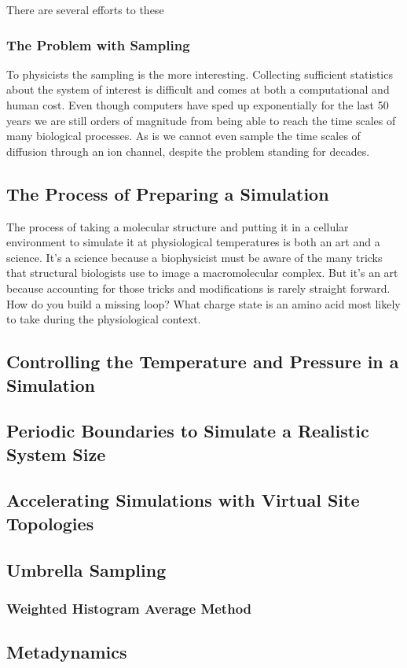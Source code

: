 There are several efforts to these 

\subsubsection{The Problem with Sampling}

To physicists the sampling is the more interesting. Collecting sufficient statistics about the system of interest is difficult and comes at both a computational and human cost. Even though computers have sped up exponentially for the last 50 years we are still orders of magnitude from being able to reach the time scales of many biological processes. As is we cannot even sample the time scales of diffusion through an ion channel, despite the problem standing for decades. 


\subsection{The Process of Preparing a Simulation}
The process of taking a molecular structure and putting it in a cellular environment to simulate it at physiological temperatures is both an art and a science. It's a science because a biophysicist must be aware of the many tricks that structural biologists use to image a macromolecular complex. But it's an art because accounting for those tricks and modifications is rarely straight forward. How do you build a missing loop? What charge state is an amino acid most likely to take during the physiological context.

\subsection{Controlling the Temperature and Pressure in a Simulation}

\subsection{Periodic Boundaries to Simulate a Realistic System Size}

\subsection{Accelerating Simulations with Virtual Site Topologies}
 
\subsection{Umbrella Sampling}

\subsubsection{Weighted Histogram Average Method}

\subsection{Metadynamics}
